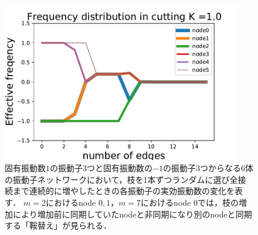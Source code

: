 \documentclass[../main]{subfiles}
\begin{document}
\begin{figure}[t]
\centering
\includegraphics[width=105mm]{./images/cutting_N6K1.pdf}
\centering
\caption{固有振動数$1$の振動子3つと固有振動数の$-1$の振動子3つからなる6体の振動子ネットワークにおいて，枝を1本ずつランダムに選び全接続まで連続的に増やしたときの各振動子の実効振動数の変化を表す．
$m=2$におけるnode $0,1$，$m=7$におけるnode $0$では，枝の増加により増加前に同期していたnodeと非同期になり別のnodeと同期する「鞍替え」が見られる．}
\label{fig:cutting_N6K1}
\end{figure}
\end{document}
